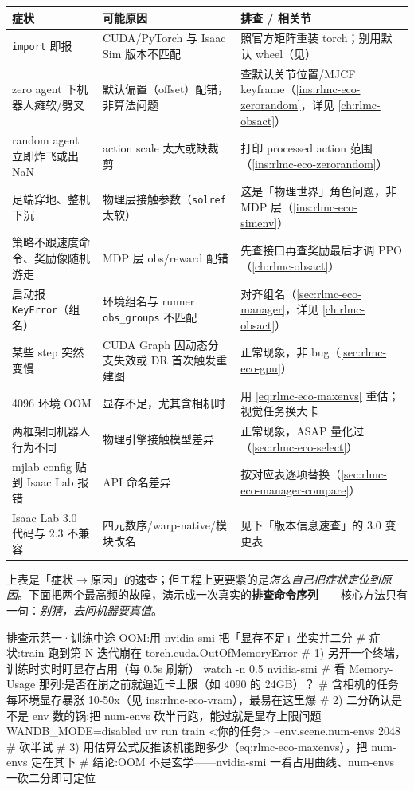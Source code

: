 \begin{center}
\small
\begin{tabular}{@{}p{3.0cm}p{3.4cm}p{6.6cm}@{}}
\toprule
症状 & 可能原因 & 排查 / 相关节 \\
\midrule
\verb|import| 即报 \Verb[breaklines]|undefined symbol| / 段错误 & CUDA/PyTorch 与 Isaac Sim 版本不匹配 & 照官方矩阵重装 torch；别用默认 wheel（见\nameref{sec:rlmc-eco-setup}） \\
zero agent 下机器人瘫软/劈叉 & 默认偏置（offset）配错，非算法问题 & 查默认关节位置/MJCF keyframe（\cref{ins:rlmc-eco-zerorandom}，详见 \cref{ch:rlmc-obsact}） \\
random agent 立即炸飞或出 NaN & action scale 太大或缺裁剪 & 打印 processed action 范围（\cref{ins:rlmc-eco-zerorandom}） \\
足端穿地、整机下沉 & 物理层接触参数（\verb|solref| 太软） & 这是「物理世界」角色问题，非 MDP 层（\cref{ins:rlmc-eco-simenv}） \\
策略不跟速度命令、奖励像随机游走 & MDP 层 obs/reward 配错 & 先查接口再查奖励最后才调 PPO（\cref{ch:rlmc-obsact}） \\
启动报 \verb|KeyError|（组名） & 环境组名与 runner \verb|obs_groups| 不匹配 & 对齐组名（\cref{sec:rlmc-eco-manager}，详见 \cref{ch:rlmc-obsact}） \\
某些 step 突然变慢 & CUDA Graph 因动态分支失效或 DR 首次触发重建图 & 正常现象，非 bug（\cref{sec:rlmc-eco-gpu}） \\
4096 环境 OOM & 显存不足，尤其含相机时 & 用 \cref{eq:rlmc-eco-maxenvs} 重估；视觉任务换大卡 \\
两框架同机器人行为不同 & 物理引擎接触模型差异 & 正常现象，ASAP 量化过\,\cite{he2025asap}（\cref{sec:rlmc-eco-select}） \\
mjlab config 贴到 Isaac Lab 报错 & API 命名差异 & 按对应表逐项替换（\cref{sec:rlmc-eco-manager-compare}） \\
Isaac Lab 3.0 代码与 2.3 不兼容 & 四元数序/warp-native/模块改名 & 见下「版本信息速查」的 3.0 变更表 \\
\bottomrule
\end{tabular}
\end{center}

上表是「症状$\to$原因」的速查；但工程上更要紧的是\emph{怎么自己把症状定位到原因}。下面把两个最高频的故障，演示成一次真实的\textbf{排查命令序列}——核心方法只有一句：\emph{别猜，去问机器要真值}。

\begin{codebox}[bash]{排查示范一·训练中途 OOM:用 nvidia-smi 把「显存不足」坐实并二分}
# 症状:train 跑到第 N 迭代崩在 torch.cuda.OutOfMemoryError
# 1) 另开一个终端，训练时实时盯显存占用（每 0.5s 刷新）
watch -n 0.5 nvidia-smi
#    看 Memory-Usage 那列:是否在崩之前就逼近卡上限（如 4090 的 24GB）？
#    含相机的任务每环境显存暴涨 10-50x（见 ins:rlmc-eco-vram），最易在这里爆
# 2) 二分确认是不是 env 数的锅:把 num-envs 砍半再跑，能过就是显存上限问题
WANDB_MODE=disabled uv run train <你的任务> --env.scene.num-envs 2048   # 砍半试
# 3) 用估算公式反推该机能跑多少（eq:rlmc-eco-maxenvs），把 num-envs 定在其下
#    结论:OOM 不是玄学——nvidia-smi 一看占用曲线、num-envs 一砍二分即可定位
\end{codebox}

